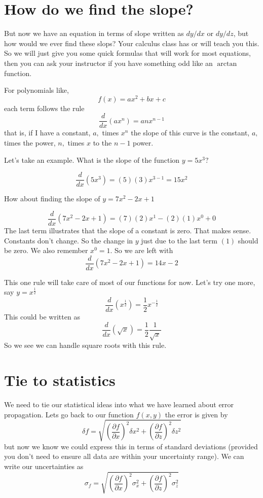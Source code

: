 \documentclass[twoside,11pt,ShortChapTitles]{BYUTextbook}
\begin{document}
\section{How do we find the slope?}

But now we have an equation in terms of slope written as $dy/dx$ or $dy/dz$,
but how would we ever find these slops? Your calculus class has or will teach
you this. So we will just give you some quick formulas that will work for most
equations, then you can ask your instructor if you have something odd like an
$\arctan$ function.

For polynomials like,
\[
f\left(  x\right)  =ax^{2}+bx+c
\]
each term follows the rule
\[
\frac{d}{dx}\left(  ax^{n}\right)  =anx^{n-1}
\]
that is, if I have a constant, $a,$ times $x^{n}$ the slope of this curve is
the constant, $a,$ times the power, $n,$ times $x$ to the $n-1$ power.

Let's take an example. What is the slope of the function $y=5x^{3}?$

\[
\frac{d}{dx}\left(  5x^{3}\right)  =\left(  5\right)  \left(  3\right)
x^{3-1}=15x^{2}
\]


How about finding the slope of $y=7x^{2}-2x+1$

\[
\frac{d}{dx}\left(  7x^{2}-2x+1\right)  =\left(  7\right)  \left(  2\right)
x^{1}-\left(  2\right)  (1)x^{0}+0
\]
The last term illustrates that the slope of a constant is zero. That makes
sense. Constants don't change. So the change in $y$ just due to the last term
$(1)$ should be zero. We also remember $x^{0}=1.$ So we are left with
\[
\frac{d}{dx}\left(  7x^{2}-2x+1\right)  =14x-2
\]


This one rule will take care of most of our functions for now. Let's try one
more, say $y=x^{\frac{1}{2}}$
\[
\frac{d}{dx}\left(  x^{\frac{1}{2}}\right)  =\frac{1}{2}x^{-\frac{1}{2}}
\]
This could be written as
\[
\frac{d}{dx}\left(  \sqrt{x}\right)  =\frac{1}{2}\frac{1}{\sqrt{x}}
\]
So we see we can handle square roots with this rule.

\section{Tie to statistics}

We need to tie our statistical ideas into what we have learned about error
propagation. Lets go back to our function $f\left(  x,y\right)  $ the error is
given by
\[
\delta f=\sqrt{\left(  \frac{\partial f}{\partial x}\right)  ^{2}\delta
x^{2}+\left(  \frac{\partial f}{\partial z}\right)  ^{2}\delta z^{2}}
\]
but now we know we could express this in terms of standard deviations
(provided you don't need to ensure all data are within your uncertainty
range). We can write our uncertainties as
\[
\sigma_{f}=\sqrt{\left(  \frac{\partial f}{\partial x}\right)  ^{2}\sigma
_{x}^{2}+\left(  \frac{\partial f}{\partial z}\right)  ^{2}\sigma_{z}^{2}}
\]
\end{document}

